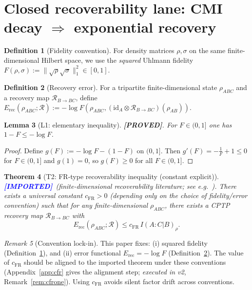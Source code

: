 \documentclass[11pt]{article}
\newtheorem{theorem}{Theorem}[section]
\newtheorem{lemma}[theorem]{Lemma}
\theoremstyle{definition}
\newtheorem{definition}[theorem]{Definition}
\theoremstyle{remark}
\newtheorem{remark}[theorem]{Remark}
\newcommand{\PROVED}{\textcolor{green!60!black}{\textbf{[PROVED]}}}
\newcommand{\IMPORTED}{\textcolor{blue}{\textbf{[IMPORTED]}}}
\newcommand{\Erec}{E_{\mathrm{rec}}}
\begin{document}
\section{Closed recoverability lane: CMI decay $\Rightarrow$ exponential
recovery}

\begin{definition}[Fidelity convention]
\label{def:fidelity}
For density matrices $\rho, \sigma$ on the same finite-dimensional
Hilbert space, we use the \emph{squared} Uhlmann fidelity $F(\rho,
\sigma) := \|\sqrt{\rho}\sqrt{\sigma}\|_1^2 \in [0, 1]$.
\end{definition}

\begin{definition}[Recovery error]
\label{def:erec}
For a tripartite finite-dimensional state $\rho_{ABC}$ and a recovery
map $\mathcal{R}_{B\to BC}$, define
$\Erec(\rho_{ABC}; \mathcal{R}) := -\log F(\rho_{ABC}, (\mathrm{id}_A
\otimes \mathcal{R}_{B\to BC})(\rho_{AB}))$.
\end{definition}

\begin{lemma}[L1: elementary inequality]
\label{lem:l1}
\PROVED. For $F \in (0, 1]$ one has $1 - F \le -\log F$.
\end{lemma}

\begin{proof}
Define $g(F) := -\log F - (1 - F)$ on $(0, 1]$. Then $g'(F) =
-\frac{1}{F} + 1 \le 0$ for $F \in (0, 1]$ and $g(1) = 0$, so $g(F) \ge
0$ for all $F \in (0, 1]$.
\end{proof}

\begin{theorem}[T2: FR-type recoverability inequality (constant
explicit)]
\label{thm:t2}
\IMPORTED\ (finite-dimensional recoverability literature; see e.g.\
\cite{FR, STH}). There exists a universal constant $c_{\mathrm{FR}} > 0$
(depending only on the choice of fidelity/error convention) such that
for any finite-dimensional $\rho_{ABC}$, there exists a CPTP recovery
map $\mathcal{R}_{B\to BC}$ with
\[
\Erec(\rho_{ABC}; \mathcal{R}) \le c_{\mathrm{FR}}\, I(A : C | B)_\rho.
\]
\end{theorem}

\begin{remark}[Convention lock-in]
\label{rem:lockin}
This paper fixes: (i) squared fidelity (Definition~\ref{def:fidelity}),
and (ii) error functional $\Erec = -\log F$
(Definition~\ref{def:erec}). The value of $c_{\mathrm{FR}}$ should be
aligned to the imported theorem under these conventions
(Appendix~\ref{app:cfr} gives the alignment step; \emph{executed in v2},
Remark~\ref{rem:cfrone}). Using $c_{\mathrm{FR}}$ avoids silent factor
drift across conventions.
\end{remark}
\end{document}
